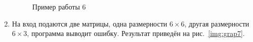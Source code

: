 \documentclass[12pt, a4paper]{article}
\begin{document}
\begin{enumerate}
\begin{figure}[h]
  		\caption{Пример работы 6}
  		\label{img:grap6}
	\end{figure}
	\newpage
	\item На вход подаются две матрицы, одна размерности $6 \times 6$, другая 
	размерности $6 \times 3$, программа выводит ошибку.	
	Результат приведён на рис.~\ref{img:grap7}.
	\begin{figure}[h]

\end{figure}
\end{enumerate}
\end{document}
